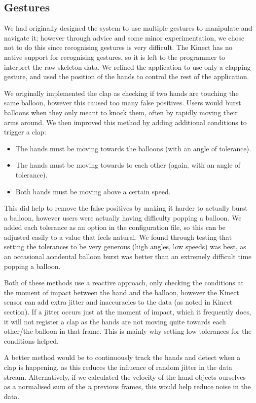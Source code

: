 \clearpage{}
\subsection{Gestures}

We had originally designed the system to use multiple gestures to manipulate and navigate it; however through advice and some minor experimentation, we chose not to do this since recognising gestures is very difficult.
The Kinect has no native support for recognising gestures, so it is left to the programmer to interpret the raw skeleton data.
We refined the application to use only a clapping gesture, and used the position of the hands to control the rest of the application.

We originally implemented the clap as checking if two hands are touching the same balloon, however this caused too many false positives.
Users would burst balloons when they only meant to knock them, often by rapidly moving their arms around.
We then improved this method by adding additional conditions to trigger a clap:

\begin{itemize}
\item{The hands must be moving towards the balloons (with an angle of tolerance).}
\item{The hands must be moving towards to each other (again, with an angle of tolerance).}
\item{Both hands must be moving above a certain speed.}
\end{itemize}

This did help to remove the false positives by making it harder to actually burst a balloon, however users were actually having difficulty popping a balloon.
We added each tolerance as an option in the configuration file, so this can be adjusted easily to a value that feels natural.
We found through testing that setting the tolerances to be very generous (high angles, low speeds) was best, as an occasional accidental balloon burst was better than an extremely difficult time popping a balloon.

Both of these methods use a reactive approach, only checking the conditions at the moment of impact between the hand and the balloon, however the Kinect sensor can add extra jitter and inaccuracies to the data (as noted in Kinect section).
If a jitter occurs just at the moment of impact, which it frequently does, it will not register a clap as the hands are not moving quite towards each other/the balloon in that frame.
This is mainly why setting low tolerances for the conditions helped.

A better method would be to continuously track the hands and detect when a clap is happening, as this reduces the influence of random jitter in the data stream.
Alternatively, if we calculated the velocity of the hand objects ourselves as a normalised sum of the \textit{n} previous frames, this would help reduce noise in the data.
